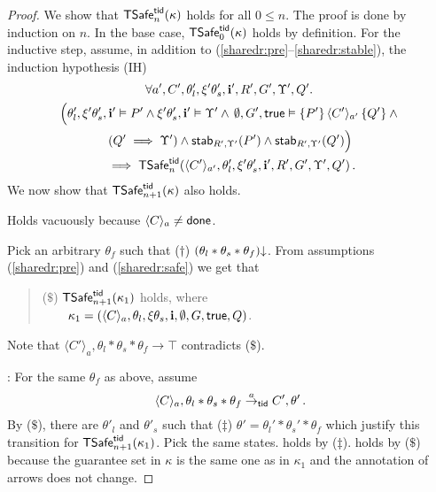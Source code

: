 \begin{proof}
We show that $\safe_n(\kappa)$ holds for all $0 \leq n$. 
The proof is done by induction on $n$.
In the base case, $\safe_0(\kappa)$ holds by definition.
For the inductive step, 
assume, in addition to (\ref{sharedr:pre}--\ref{sharedr:stable}), 
the induction hypothesis (IH)  
\begin{multline*}    
  \forall a', C',\theta'_l,\xi'\theta'_s,\intp',R',G',\Upsilon', Q'.\,
  \\
  \Big(\theta'_l,\xi'\theta'_s,\intp' \vDash P' \land \xi'\theta'_s,\intp' \vDash \Upsilon'
  \land \mbox{}\,
  \emptyset,G',\true \vDash \{ P' \} \,\langle C'\rangle_{a'}\, \{ Q' \} \land \mbox{}
  \\
  (Q' \implies \Upsilon') \land \mbox{} 
  \mbox{}   \stable{P'}{R'}{\Upsilon'} \land  \stable{Q'}{R'}{\Upsilon'}\Big)
  \\
  \mbox{} \implies  \safe_n(\langle C' \rangle_{a'},\theta'_l,\xi'\theta'_s,\intp',R',G',\Upsilon',Q')\,.   
\end{multline*}
We now show that $\safe_{n+1}(\kappa)$ also holds.



Holds vacuously because  $\langle C \rangle_a \neq \done$.

Pick an arbitrary $\theta_f$ such that ($\dagger$) 
$\consistent{\theta_l*\theta_s*\theta_f}$.
From assumptions (\ref{sharedr:pre}) and (\ref{sharedr:safe}) we get that  
\begin{quote}
($\$$) $\safe_{n+1}(\kappa_1)$ holds,  where\\
 $\qquad\kappa_1 = (\langle C \rangle_a,\theta_l,\xi\theta_s,\intp,\emptyset,G,\true, Q)$.
\end{quote}
Note that  
$\langle C' \rangle_a,\theta_l*\theta_s*\theta_f \rightarrow \top$   
contradicts  ($\$$).

: 
For the same $\theta_f$ as above, 
assume 
$$\langle C \rangle_a, \theta_l * \theta_s * \theta_f \stackrel{a}{\rightarrow}_{\ltid} C',\theta'\,.
$$
By ($\$$), 
there are  $\theta'_l$  and $\theta'_s$ 
such that ($\ddag$) $\theta'=\theta_l' * \theta_s'*\theta_f$  
which justify this transition for 
$\safe_{n+1}(\kappa_1)$.
Pick the same states.
 holds by ($\ddag$).
  holds by ($\$$) because the guarantee set in $\kappa$ is the same one as in  $\kappa_1$ and the annotation of arrows does not change. 


\end{proof}
